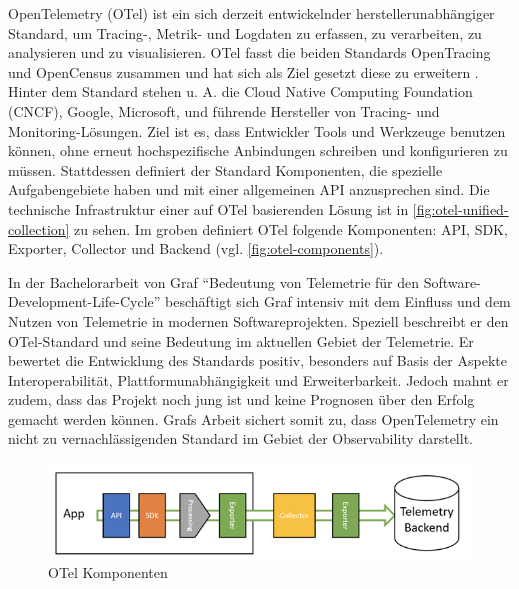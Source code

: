 OpenTelemetry (OTel) \cite{OpenTelemetry} ist ein sich derzeit\footnotemark{} entwickelnder herstellerunabhängiger Standard, um Tracing-, Metrik- und Logdaten\footnotemark{} zu erfassen, zu verarbeiten, zu analysieren und zu visualisieren. OTel fasst die beiden Standards OpenTracing und OpenCensus \cite{OpenCensus} zusammen und hat sich als Ziel gesetzt diese zu erweitern \cite{UseNixDistributiveTracing}. Hinter dem Standard stehen u. A. die Cloud Native Computing Foundation (CNCF), Google, Microsoft, und führende Hersteller von Tracing- und Monitoring-Lösungen. Ziel ist es, dass Entwickler Tools und Werkzeuge benutzen können, ohne erneut hochspezifische Anbindungen schreiben und konfigurieren zu müssen. Stattdessen definiert der Standard Komponenten, die spezielle Aufgabengebiete haben und mit einer allgemeinen API anzusprechen sind. Die technische Infrastruktur einer auf OTel basierenden Lösung ist in \autoref{fig:otel-unified-collection} zu sehen. Im groben definiert OTel folgende Komponenten: API, SDK, Exporter, Collector und Backend (vgl. \autoref{fig:otel-components}).


In der Bachelorarbeit von Graf \enquote{Bedeutung von Telemetrie für den Software-Development-Life-Cycle} \cite{MichaelGrafBA} beschäftigt sich Graf intensiv mit dem Einfluss und dem Nutzen von Telemetrie in modernen Softwareprojekten. Speziell beschreibt er den OTel-Standard und seine Bedeutung im aktuellen Gebiet der Telemetrie. Er bewertet die Entwicklung des Standards positiv, besonders auf Basis der Aspekte Interoperabilität, Plattformunabhängigkeit und Erweiterbarkeit. Jedoch mahnt er zudem, dass das Projekt noch jung ist und keine Prognosen über den Erfolg gemacht werden können. Grafs Arbeit sichert somit zu, dass OpenTelemetry ein nicht zu vernachlässigenden Standard im Gebiet der Observability darstellt.


\begin{figure}[H]
	\centering
	\includegraphics[width=0.75\linewidth]{img/03_methoden/dynatrace_otel-components.png}
	\caption{OTel Komponenten \cite{DynatraceOTelComponents}}
	\label{fig:otel-components}
\end{figure}

